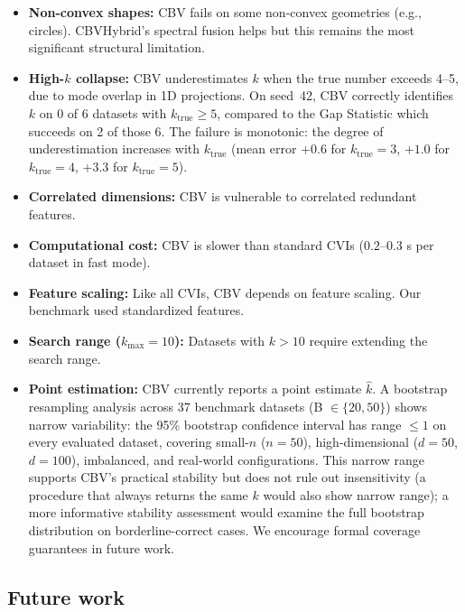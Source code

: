 \documentclass[journal]{IEEEtran}
\begin{document}
\begin{itemize}
    \item \textbf{Non-convex shapes:} CBV fails on some non-convex geometries (e.g., circles). CBVHybrid's spectral fusion helps but this remains the most significant structural limitation.
    \item \textbf{High-$k$ collapse:} CBV underestimates $k$ when the true number exceeds 4--5, due to mode overlap in 1D projections. On seed~42, CBV correctly identifies $k$ on 0 of 6 datasets with $k_{\mathrm{true}} \geq 5$, compared to the Gap Statistic which succeeds on 2 of those 6. The failure is monotonic: the degree of underestimation increases with $k_{\mathrm{true}}$ (mean error $+0.6$ for $k_{\mathrm{true}}=3$, $+1.0$ for $k_{\mathrm{true}}=4$, $+3.3$ for $k_{\mathrm{true}}=5$).
    \item \textbf{Correlated dimensions:} CBV is vulnerable to correlated redundant features.
    \item \textbf{Computational cost:} CBV is slower than standard CVIs ($0.2$--$0.3$ s per dataset in fast mode).
    \item \textbf{Feature scaling:} Like all CVIs, CBV depends on feature scaling. Our benchmark used standardized features.
    \item \textbf{Search range ($k_{\max} = 10$):} Datasets with $k > 10$ require extending the search range.
    \item \textbf{Point estimation:} CBV currently reports a point estimate $\hat{k}$. A bootstrap resampling analysis across 37 benchmark datasets (B $\in \{20, 50\}$) shows narrow variability: the 95\% bootstrap confidence interval has range $\leq 1$ on every evaluated dataset, covering small-$n$ ($n=50$), high-dimensional ($d=50$, $d=100$), imbalanced, and real-world configurations. This narrow range supports CBV's practical stability but does not rule out insensitivity (a procedure that always returns the same $k$ would also show narrow range); a more informative stability assessment would examine the full bootstrap distribution on borderline-correct cases. We encourage formal coverage guarantees in future work.
\end{itemize}

\subsection{Future work}
\label{sec:future-work}
\end{document}
